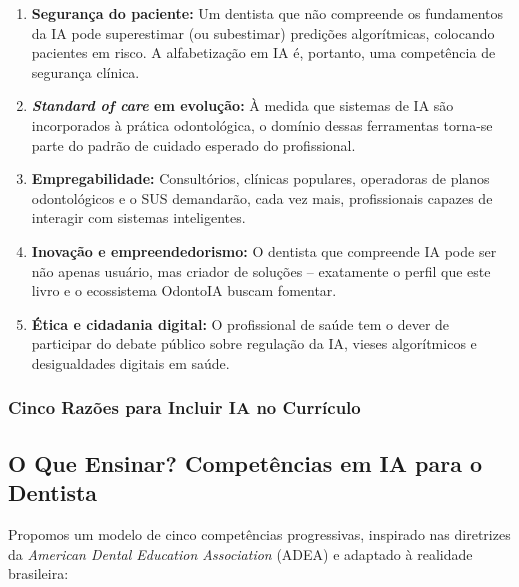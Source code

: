 \begin{enumerate}
  \item \textbf{Segurança do paciente:} Um dentista que não compreende os
    fundamentos da IA pode superestimar (ou subestimar) predições algorítmicas,
    colocando pacientes em risco. A alfabetização em IA é, portanto, uma
    competência de segurança clínica.

  \item \textbf{\textit{Standard of care} em evolução:} À medida que sistemas de
    IA são incorporados à prática odontológica, o domínio dessas ferramentas
    torna-se parte do padrão de cuidado esperado do profissional.

  \item \textbf{Empregabilidade:} Consultórios, clínicas populares, operadoras
    de planos odontológicos e o SUS demandarão, cada vez mais, profissionais
    capazes de interagir com sistemas inteligentes.

  \item \textbf{Inovação e empreendedorismo:} O dentista que compreende IA pode
    ser não apenas usuário, mas criador de soluções -- exatamente o perfil que
    este livro e o ecossistema OdontoIA buscam fomentar.

  \item \textbf{Ética e cidadania digital:} O profissional de saúde tem o dever
    de participar do debate público sobre regulação da IA, vieses algorítmicos
    e desigualdades digitais em saúde.
\end{enumerate}

\subsubsection{Cinco Razões para Incluir IA no Currículo}

\subsection{O Que Ensinar? Competências em IA para o Dentista}

Propomos um modelo de cinco competências progressivas, inspirado nas diretrizes
da \textit{American Dental Education Association} (ADEA) e adaptado à realidade
brasileira:

